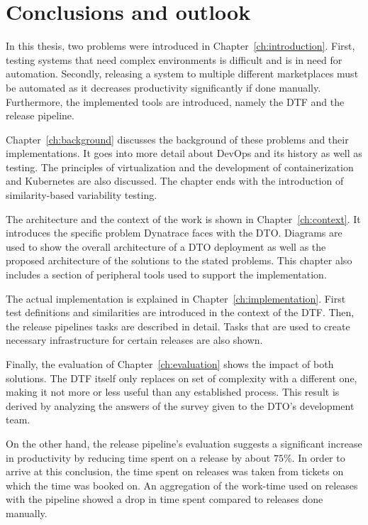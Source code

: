 \chapter{Conclusions and outlook}\label{ch:conclusions-and-outlook}

In this thesis, two problems were introduced in Chapter~\ref{ch:introduction}.
First, testing systems that need complex environments is difficult and is in need for automation.
Secondly, releasing a system to multiple different marketplaces must be automated as it decreases productivity significantly if done manually.
Furthermore, the implemented tools are introduced, namely the DTF and the release pipeline.

Chapter~\ref{ch:background} discusses the background of these problems and their implementations.
It goes into more detail about DevOps and its history as well as testing.
The principles of virtualization and the development of containerization and Kubernetes are also discussed.
The chapter ends with the introduction of similarity-based variability testing.

The architecture and the context of the work is shown in Chapter~\ref{ch:context}.
It introduces the specific problem Dynatrace faces with the DTO.
Diagrams are used to show the overall architecture of a DTO deployment as well as the proposed architecture of the solutions to the stated problems.
This chapter also includes a section of peripheral tools used to support the implementation.

The actual implementation is explained in Chapter~\ref{ch:implementation}.
First test definitions and similarities are introduced in the context of the DTF.
Then, the release pipelines tasks are described in detail.
Tasks that are used to create necessary infrastructure for certain releases are also shown.

Finally, the evaluation of Chapter~\ref{ch:evaluation} shows the impact of both solutions.
The DTF itself only replaces on set of complexity with a different one, making it not more or less useful than any established process.
This result is derived by analyzing the answers of the survey given to the DTO's development team.

\pagebreak

On the other hand, the release pipeline's evaluation suggests a significant increase in productivity by reducing time spent on a release by about $75 \%$.
In order to arrive at this conclusion, the time spent on releases was taken from tickets on which the time was booked on.
An aggregation of the work-time used on releases with the pipeline showed a drop in time spent compared to releases done manually.

